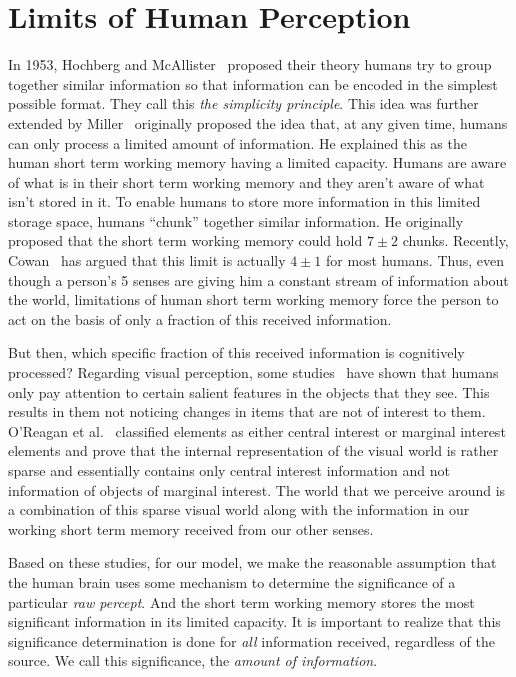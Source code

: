 \section{Limits of Human Perception}
\label{IBP:ReviewPerception}

In 1953, Hochberg and McAllister~\cite{Hochberg:1953eh} proposed their theory humans try to group together similar information so that information can be encoded in the simplest possible format. They call this \emph{the simplicity principle}. This idea was further extended by Miller~\cite{Miller:1956tr} originally proposed the idea that, at any given time, humans can only process a limited amount of information. He explained this as the human short term working memory having a limited capacity. Humans are aware of what is in their short term working memory and they aren't aware of what isn't stored in it. To enable humans to store more information in this limited storage space, humans ``chunk'' together similar information. He originally proposed that the short term working memory could hold $7\pm 2$ chunks. Recently, Cowan~\cite{Cowan:2001wi} has argued that this limit is actually $4\pm 1$ for most humans. Thus, even though a person's 5 senses are giving him a constant stream of information about the world, limitations of human short term working memory force the person to act on the basis of only a fraction of this received information.

But then, which specific fraction of this received information is cognitively processed? Regarding visual perception, some studies~\cite{Itti:2001wa,OReagan:1999wj,Triesch:2003vz} have shown that humans only pay attention to certain salient features in the objects that they see. This results in them not noticing changes in items that are not of interest to them. O'Reagan et al.~\cite{OReagan:1999wj} classified elements as either central interest or marginal interest elements and prove that the internal representation of the visual world is rather sparse and essentially contains only central interest information and not information of objects of marginal interest. The world that we perceive around is a combination of this sparse visual world along with the information in our working short term memory received from our other senses.

Based on these studies, for our model, we make the reasonable assumption that the human brain uses some mechanism to determine the significance of a particular \emph{raw percept}. And the short term working memory stores the most significant information in its limited capacity. It is important to realize that this significance determination is done for \emph{all} information received, regardless of the source. We call this significance, the \emph{amount of information}.

